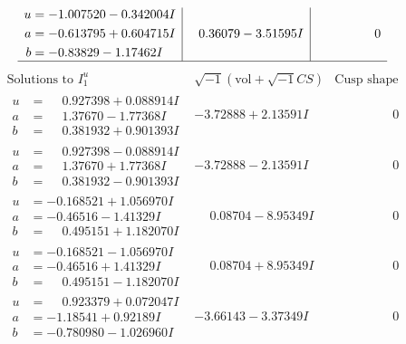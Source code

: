 \documentclass[1p]{elsarticle_modified}
\theoremstyle{definition}
\newcommand{\I}{\sqrt{-1}}
\begin{document}
$$\begin{array}{c|c|c}
\begin{aligned}
u &= -1.007520 - 0.342004 I \\
a &= -0.613795 + 0.604715 I \\
b &= -0.83829 - 1.17462 I\end{aligned}
 & \phantom{-}0.36079 - 3.51595 I & \phantom{-0.000000 } 0\\
 \hline 
 \end{array}$$\newpage$$\begin{array}{c|c|c}  
\text{Solutions to }I^u_{1}& \I (\text{vol} + \sqrt{-1}CS) & \text{Cusp shape}\\
 \hline 
\begin{aligned}
u &= \phantom{-}0.927398 + 0.088914 I \\
a &= \phantom{-}1.37670 - 1.77368 I \\
b &= \phantom{-}0.381932 + 0.901393 I\end{aligned}
 & -3.72888 + 2.13591 I & \phantom{-0.000000 } 0 \\ \hline\begin{aligned}
u &= \phantom{-}0.927398 - 0.088914 I \\
a &= \phantom{-}1.37670 + 1.77368 I \\
b &= \phantom{-}0.381932 - 0.901393 I\end{aligned}
 & -3.72888 - 2.13591 I & \phantom{-0.000000 } 0 \\ \hline\begin{aligned}
u &= -0.168521 + 1.056970 I \\
a &= -0.46516 - 1.41329 I \\
b &= \phantom{-}0.495151 + 1.182070 I\end{aligned}
 & \phantom{-}0.08704 - 8.95349 I & \phantom{-0.000000 } 0 \\ \hline\begin{aligned}
u &= -0.168521 - 1.056970 I \\
a &= -0.46516 + 1.41329 I \\
b &= \phantom{-}0.495151 - 1.182070 I\end{aligned}
 & \phantom{-}0.08704 + 8.95349 I & \phantom{-0.000000 } 0 \\ \hline\begin{aligned}
u &= \phantom{-}0.923379 + 0.072047 I \\
a &= -1.18541 + 0.92189 I \\
b &= -0.780980 - 1.026960 I\end{aligned}
 & -3.66143 - 3.37349 I & \phantom{-0.000000 } 0 \\ \hline\begin{aligned}

\end{aligned}
\end{array}$$
\end{document}
